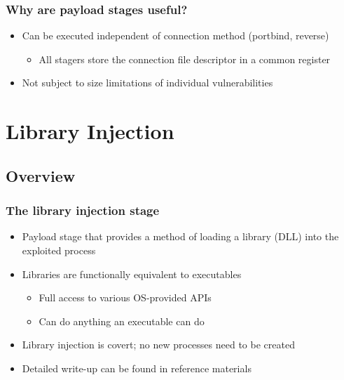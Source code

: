 \documentclass{beamer}
\newenvironment{sitemize}{\vspace{1mm}\begin{itemize}\itemsep 4pt\small}{\end{itemize}}
\begin{document}
\begin{frame}[t]
    \frametitle{Why are payload stages useful?}

    \begin{sitemize}
        \item Can be executed independent of connection method
        (portbind, reverse)
        \begin{sitemize}
            \item All stagers store the connection file descriptor
            in a common register
        \end{sitemize}

        \pause
        \item Not subject to size limitations of individual
        vulnerabilities
    \end{sitemize}
\end{frame}

\section{Library Injection}

\subsection{Overview}

\begin{frame}[t]
    \frametitle{The library injection stage}

    \begin{sitemize}
        \item Payload stage that provides a method of loading a
        library (DLL) into the exploited process

        \pause
        \item Libraries are functionally equivalent to executables
        \begin{sitemize}
            \item Full access to various OS-provided APIs
            \item Can do anything an executable can do
        \end{sitemize}

        \pause
        \item Library injection is covert; no new processes
        need to be created

        \pause
        \item Detailed write-up can be found in reference materials

    \end{sitemize}
\end{frame}
\end{document}
